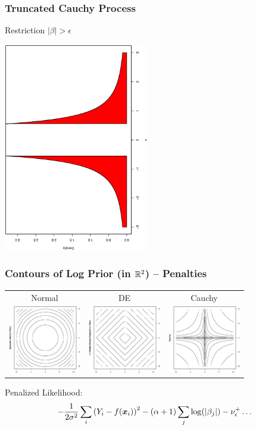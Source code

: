 \documentclass[handout]{beamer}
\newcommand{\bs}[2]{\begin{frame} \frametitle{#1}
{#2}
\end{frame} }
\begin{document}
\bs{Truncated Cauchy Process} {
\centerline{Restriction  $|\beta| > \epsilon$}

\centerline{\includegraphics[width=2.5in,angle=270]{cauchy1.ps}}
}


\bs{Contours of Log Prior (in $\mathbb{R}^2$) -- Penalties} {
\begin{tabular}{ccc}
Normal  & DE  & Cauchy \\
\includegraphics[angle=270,width=1.25in]{L2.ps} &
\includegraphics[angle=270,width=1.25in]{L1.ps} &
\includegraphics[angle=270,width=1.25in]{cauchy.ps}
\end{tabular}

\vspace{.25in}
Penalized Likelihood:
$$-\frac{1}{2 \sigma^2} \sum_i\left(Y_i - f(\bm x_i)\right)^2  - (\alpha +
1) \sum_j
\log(|\beta_j|)  - \nu^+_{\epsilon} \ldots $$

}
\end{document}
